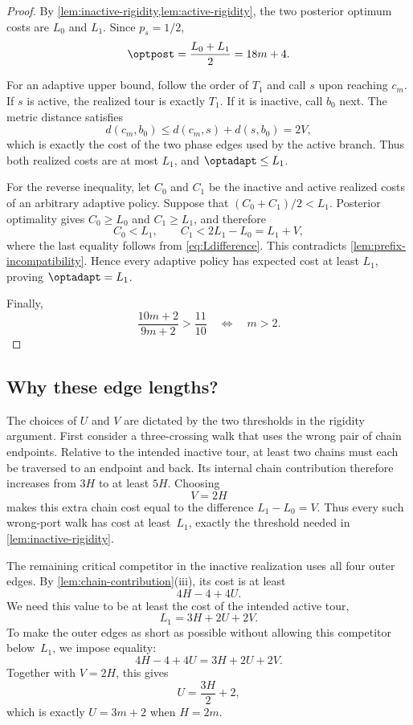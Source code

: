 \begin{proof}
By \cref{lem:inactive-rigidity,lem:active-rigidity}, the two posterior optimum
costs are $L_0$ and $L_1$.  Since $p_s=1/2$,
\[
  \optpost=\frac{L_0+L_1}{2}=18m+4.
\]

For an adaptive upper bound, follow the order of $T_1$ and call $s$ upon
reaching $c_m$.  If $s$ is active, the realized tour is exactly $T_1$.  If it
is inactive, call $b_0$ next.  The metric distance satisfies
\[
  d(c_m,b_0)\le d(c_m,s)+d(s,b_0)=2V,
\]
which is exactly the cost of the two phase edges used by the active branch.
Thus both realized costs are at most $L_1$, and
$\optadapt\le L_1$.

For the reverse inequality, let $C_0$ and $C_1$ be the inactive and active
realized costs of an arbitrary adaptive policy.  Suppose that
$(C_0+C_1)/2<L_1$.  Posterior optimality gives
$C_0\ge L_0$ and $C_1\ge L_1$, and therefore
\[
  C_0<L_1,
  \qquad
  C_1<2L_1-L_0=L_1+V,
\]
where the last equality follows from \cref{eq:Ldifference}.  This contradicts
\cref{lem:prefix-incompatibility}.  Hence every adaptive policy has expected
cost at least $L_1$, proving $\optadapt=L_1$.

Finally,
\[
  \frac{10m+2}{9m+2}>\frac{11}{10}
  \quad\Longleftrightarrow\quad
  m>2.
\]
\end{proof}

\subsection{Why these edge lengths?}

The choices of $U$ and $V$ are dictated by the two thresholds in the rigidity
argument.  First consider a three-crossing walk that uses the wrong pair of
chain endpoints.  Relative to the intended inactive tour, at least two chains
must each be traversed to an endpoint and back.  Its internal chain
contribution therefore increases from $3H$ to at least $5H$.  Choosing
\[
  V=2H
\]
makes this extra chain cost equal to the difference
$L_1-L_0=V$.  Thus every such wrong-port walk has cost at least~$L_1$, exactly
the threshold needed in \cref{lem:inactive-rigidity}.

The remaining critical competitor in the inactive realization uses all four
outer edges.  By \cref{lem:chain-contribution}(iii), its cost is at least
\[
  4H-4+4U.
\]
We need this value to be at least the cost of the intended active tour,
\[
  L_1=3H+2U+2V.
\]
To make the outer edges as short as possible without allowing this competitor
below~$L_1$, we impose equality:
\[
  4H-4+4U=3H+2U+2V.
\]
Together with $V=2H$, this gives
\[
  U=\frac{3H}{2}+2,
\]
which is exactly $U=3m+2$ when $H=2m$.

